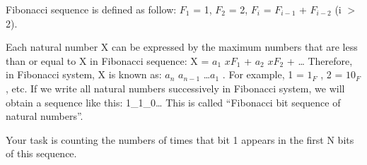 Fibonacci sequence is defined as follow: $F_{1}$   = 1, $F_{2}$   = 2, $F_{i}$   = $F_{i-1}$   + $F_{i-2}$   (i $>$ 2).  

   Each natural number X can be expressed by the maximum numbers that are less than or equal to X in Fibonacci sequence: X = $a_{1}$   $xF_{1}$   + $a_{2}$   $xF_{2}$   + … Therefore, in Fibonacci system, X is known as: $a_{n}$   $a_{n-1}$   …$a_{1}$   . For example, 1 = $1_{F}$   , 2 = $10_{F}$   , etc. If we write all natural numbers successively in Fibonacci system, we will obtain a sequence like this: 1\_1\_0… This is called “Fibonacci bit sequence of natural numbers”.  

   Your task is counting the numbers of times that bit 1 appears in the first N bits of this sequence.